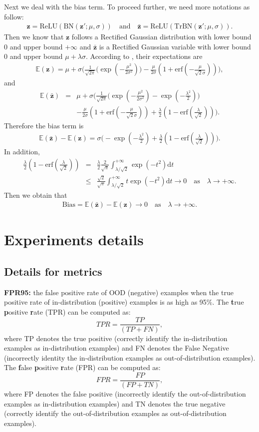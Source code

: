 \documentclass{article}
\newcommand{\benr}{\begin{eqnarray}}
\newcommand{\eenr}{\end{eqnarray}}
\def\rvz{{\mathbf{z}}}
\newcommand{\E}{\mathbb{E}}
\begin{document}
Next we deal with the bias term. To proceed further, we need more notations as follow:
\benr
\rvz = \text{ReLU}(\text{BN}(\rvz'; \mu, \sigma)) \quad \text{and} \quad \bar \rvz = \text{ReLU}(\text{TrBN}(\rvz'; \mu, \sigma)). 
\eenr
Then we know that $\rvz$ follows a Rectified Gaussian distribution with lower bound $0$ and upper bound $+\infty$
and $\bar \rvz$ is a Rectified Gaussian variable with lower bound $0$ and upper bound $\mu+ \lambda \sigma.$
According to \cite{PALMER201751}, their expectations are
\benr
\E(\rvz) = \mu + \sigma \Big(\frac{1}{\sqrt{2\pi}} \big( \exp(-\frac{\mu^2}{2\sigma^2})  \big)   - \frac{\mu}{2\sigma}(1+\text{erf}(-\frac{\mu}{\sqrt{2}\sigma})) \Big),
\eenr
and
\benr
\E(\bar \rvz) &=& \mu + \sigma \Big(\frac{1}{\sqrt{2\pi}} \big( \exp(-\frac{\mu^2}{2\sigma^2}) - \exp(-\frac{\lambda^2}{2})  \big)   \\
&& - \frac{\mu}{2\sigma}(1+\text{erf}(-\frac{\mu}{\sqrt{2}\sigma})) + \frac{\lambda}{2} (1-\text{erf}(\frac{\lambda}{\sqrt 2}))\Big). \nonumber
\eenr
Therefore the bias term is
\benr
\E(\bar \rvz)-\E(\rvz) = \sigma\Big( - \exp(-\frac{\lambda^2}{2}) + \frac{\lambda}{2} (1-\text{erf}(\frac{\lambda}{\sqrt 2})) \Big).
\eenr
In addition,
\benr
\frac{\lambda}{2} (1-\text{erf}(\frac{\lambda}{\sqrt 2})) &=& \frac{\lambda}{2}\frac{2}{\sqrt \pi} \int_{\lambda/\sqrt{2}}^{+\infty} \exp(-t^2) \mathrm{d}t \\
&\leq& \frac{\sqrt 2}{\sqrt \pi} \int_{\lambda/\sqrt{2}}^{+\infty} t \exp(-t^2) \mathrm{d}t \to 0 \quad \text{as} \quad \lambda \to +\infty. \nonumber
\eenr
Then we obtain that
\benr
\text{Bias} = \E(\bar \rvz)-\E(\rvz) \to 0 \quad \text{as} \quad \lambda\to +\infty. 
\eenr




\section{Experiments details}\label{App:details}
\subsection{Details for metrics}
\textbf{FPR95:} the false positive rate of OOD (negative) examples when the true positive rate of in-distribution (positive) examples is as high as 95$\%$. The \textbf{t}rue \textbf{p}ositive \textbf{r}ate (TPR) can be computed as:
\begin{equation}
    TPR = \frac{TP}{(TP+FN)},
\label{Eq:TPR}
\end{equation}
where TP denotes the true positive (correctly identify the in-distribution examples as in-distribution examples) and FN denotes the False Negative (incorrectly identity the in-distribution examples as out-of-distribution examples). The \textbf{f}alse \textbf{p}ositive \textbf{r}ate (FPR) can be computed as:
\begin{equation}
    FPR = \frac{FP}{(FP+TN)},
\label{Eq:FPR}
\end{equation}
where FP denotes the false positive (incorrectly identify the out-of-distribution examples as in-distribution examples) and TN denotes the true negative (correctly identify the out-of-distribution examples as out-of-distribution examples).
\end{document}
